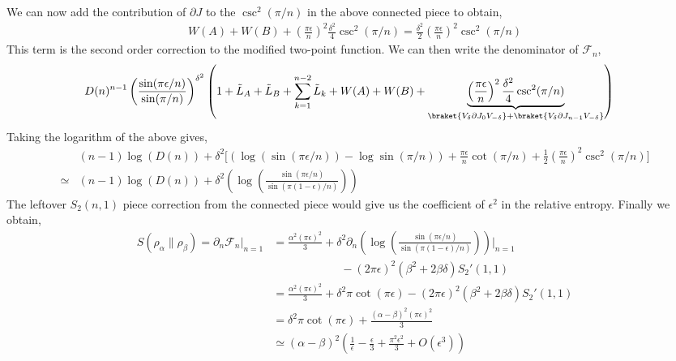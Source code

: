 \documentclass[11pt]{article}
\newcommand{\ep}{\epsilon}
\newcommand{\p}{\partial}
\newcommand{\lb}{\left(}
\newcommand{\rb}{\right)}
\begin{document}
We can now add the contribution of $\p J$ to the $\csc^2(\pi /n)$ in the above connected piece to obtain,
\begin{align}
    W(A) + W(B) + \lb\frac{\pi \ep}{n}\rb^2 \frac{\delta^2}{4}\csc^2(\pi/n) = \frac{\delta^2}{2} \lb\frac{\pi \ep}{n}\rb^2 \csc^2(\pi/n)
\end{align}
This term is the second order correction to the modified two-point function. We can then write the denominator of $\mathcal{F}_n$,
\begin{align}
   &D(n)^{n-1} \lb \frac{\sin (\pi \ep/n)}{\sin(\pi/n)}\rb^{\delta^2} \lb 1+ \tilde{L}_A + \tilde{L}_B + \sum_{k=1}^{n-2}\tilde{L}_k + W(A) + W(B) +\underbrace{\lb\frac{\pi \ep}{n}\rb^2 \frac{\delta^2}{4}\csc^2(\pi/n)}_{\braket{V_\delta \p J_0 V_{-\delta}} + \braket{V_\delta \p J_{n-1} V_{-\delta}}} \rb
\end{align}
Taking the logarithm of the above gives,
\begin{align}
    &(n-1)\log(D(n)) + \delta^2 \Bigg[ \lb \log (\sin (\pi \ep/n)) -  \log\sin(\pi/n)\rb + \frac{\pi \ep}{n} \cot(\pi /n) + \frac{1}{2}\lb\frac{\pi \ep}{n}\rb^2 \csc^2(\pi/n)\Bigg] \\
    \simeq &(n-1)\log(D(n)) + \delta^2 \lb \log \lb\frac{\sin(\pi\ep/n)}{\sin(\pi (1-\ep)/n)}\rb \rb
\end{align}
The leftover $S_2(n,1)$ piece correction from the connected piece would give us the coefficient of $\ep^2$ in the relative entropy. Finally we obtain,
\begin{align}
    S(\rho_\alpha \| \rho_\beta) = \p_n \mathcal{F}_n|_{n=1} &= \frac{\alpha^2 (\pi \ep)^2}{3} + \delta^2 \p_n  \lb \log \lb\frac{\sin(\pi\ep/n)}{\sin(\pi (1-\ep)/n)}\rb \rb\Bigg|_{n=1}\\&\qquad\qquad \qquad - (2\pi \ep)^2\lb \beta^2 + 2\beta \delta  \rb S_2'(1,1)\\&= \frac{\alpha^2 (\pi \ep)^2}{3} + \delta^2 \pi \cot(\pi \ep) - (2\pi \ep)^2\lb \beta^2 + 2\beta \delta  \rb S_2'(1,1) \\
    &=   \delta^2 \pi \cot(\pi \ep) +   \frac{(\alpha - \beta)^2(\pi \ep)^2}{3} \\
    &\simeq  (\alpha - \beta)^2 \lb \frac{1}{\ep} - \frac{\ep}{3} + \frac{\pi ^2 \ep^2}{3} + O(\ep^3)\rb
\end{align}
\end{document}

